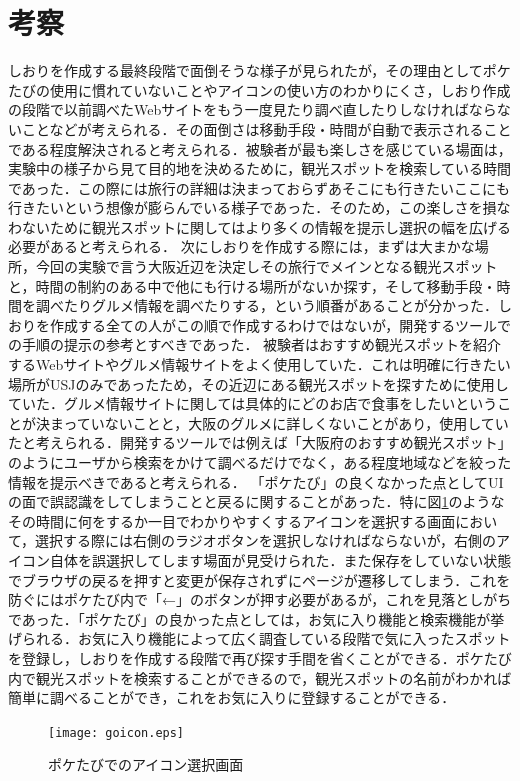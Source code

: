 \documentclass{funthesis}
\begin{document}
\section{考察}
しおりを作成する最終段階で面倒そうな様子が見られたが，その理由としてポケたびの使用に慣れていないことやアイコンの使い方のわかりにくさ，しおり作成の段階で以前調べたWebサイトをもう一度見たり調べ直したりしなければならないことなどが考えられる．その面倒さは移動手段・時間が自動で表示されることである程度解決されると考えられる．被験者が最も楽しさを感じている場面は，実験中の様子から見て目的地を決めるために，観光スポットを検索している時間であった．この際には旅行の詳細は決まっておらずあそこにも行きたいここにも行きたいという想像が膨らんでいる様子であった．そのため，この楽しさを損なわないために観光スポットに関してはより多くの情報を提示し選択の幅を広げる必要があると考えられる．
次にしおりを作成する際には，まずは大まかな場所，今回の実験で言う大阪近辺を決定しその旅行でメインとなる観光スポットと，時間の制約のある中で他にも行ける場所がないか探す，そして移動手段・時間を調べたりグルメ情報を調べたりする，という順番があることが分かった．しおりを作成する全ての人がこの順で作成するわけではないが，開発するツールでの手順の提示の参考とすべきであった．
被験者はおすすめ観光スポットを紹介するWebサイトやグルメ情報サイトをよく使用していた．これは明確に行きたい場所がUSJのみであったため，その近辺にある観光スポットを探すために使用していた．グルメ情報サイトに関しては具体的にどのお店で食事をしたいということが決まっていないことと，大阪のグルメに詳しくないことがあり，使用していたと考えられる．開発するツールでは例えば「大阪府のおすすめ観光スポット」のようにユーザから検索をかけて調べるだけでなく，ある程度地域などを絞った情報を提示べきであると考えられる．
「ポケたび」の良くなかった点としてUIの面で誤認識をしてしまうことと戻るに関することがあった．特に図\ref{Lgoicon}のようなその時間に何をするか一目でわかりやすくするアイコンを選択する画面において，選択する際には右側のラジオボタンを選択しなければならないが，右側のアイコン自体を誤選択してします場面が見受けられた．また保存をしていない状態でブラウザの戻るを押すと変更が保存されずにページが遷移してしまう．これを防ぐにはポケたび内で「←」のボタンが押す必要があるが，これを見落としがちであった．「ポケたび」の良かった点としては，お気に入り機能と検索機能が挙げられる．お気に入り機能によって広く調査している段階で気に入ったスポットを登録し，しおりを作成する段階で再び探す手間を省くことができる．ポケたび内で観光スポットを検索することができるので，観光スポットの名前がわかれば簡単に調べることができ，これをお気に入りに登録することができる．

\begin{figure}[htpb]
\begin{center}
\texttt{[image: goicon.eps]}
\end{center}
\caption{ポケたびでのアイコン選択画面}
\label{Lgoicon}
\end{figure}
\end{document}
